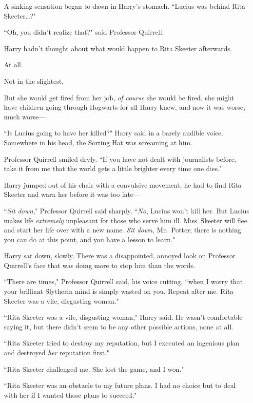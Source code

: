 A sinking sensation began to dawn in Harry's stomach. ``Lucius was behind Rita Skeeter{\ldots}?"

``Oh, you didn't realize that?" said Professor Quirrell.

Harry hadn't thought about what would happen to Rita Skeeter afterwards.

At all.

Not in the slightest.

But she would get fired from her job, \emph{of course} she would be fired, she might have children going through Hogwarts for all Harry knew, and now it was worse, much worse—

``Is Lucius going to have her killed?" Harry said in a barely audible voice. Somewhere in his head, the Sorting Hat was screaming at him.

Professor Quirrell smiled dryly. ``If you have not dealt with journalists before, take it from me that the world gets a little brighter every time one dies."

Harry jumped out of his chair with a convulsive movement, he had to find Rita Skeeter and warn her before it was too late—

``\emph{Sit down}," Professor Quirrell said sharply. ``\emph{No}, Lucius won't kill her. But Lucius makes life \emph{extremely} unpleasant for those who serve him ill. Miss~Skeeter will flee and start her life over with a new name. \emph{Sit down,} Mr.~Potter; there is nothing you can do at this point, and you have a lesson to learn."

Harry sat down, slowly. There was a disappointed, annoyed look on Professor Quirrell's face that was doing more to stop him than the words.

``There are times," Professor Quirrell said, his voice cutting, ``when I worry that your brilliant Slytherin mind is simply wasted on you. Repeat after me. Rita Skeeter was a vile, disgusting woman."

``Rita Skeeter was a vile, disgusting woman," Harry said. He wasn't comfortable saying it, but there didn't seem to be any other possible actions, none at all.

``Rita Skeeter tried to destroy my reputation, but I executed an ingenious plan and destroyed \emph{her} reputation first."

``Rita Skeeter challenged me. She lost the game, and I won."

``Rita Skeeter was an obstacle to my future plans. I had no choice but to deal with her if I wanted those plans to succeed."

